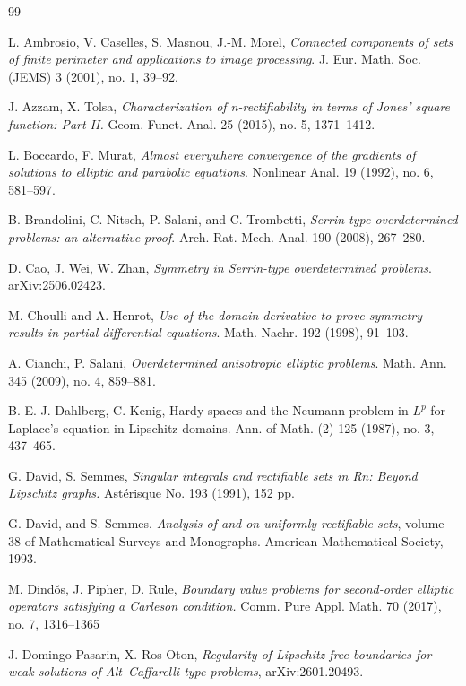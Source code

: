 \documentclass[reqno,11pt]{amsart}
\numberwithin{equation}{section}
\theoremstyle{remark}
\begin{document}
\begin{thebibliography}{99}



 L. Ambrosio, V. Caselles, S. Masnou, J.-M. Morel, \emph{Connected components of sets of finite perimeter and applications to image processing}. J. Eur. Math. Soc. (JEMS) 3 (2001),  no. 1, 39--92.

J. Azzam, X. Tolsa, 
\emph{Characterization of n-rectifiability in terms of Jones' square function: Part II. }
Geom. Funct. Anal. 25 (2015), no. 5, 1371--1412.

L. Boccardo, F. Murat,
{\em Almost everywhere convergence of the gradients of solutions to elliptic and parabolic equations}.
Nonlinear Anal. 19 (1992), no. 6, 581--597.


B. Brandolini, C. Nitsch, P. Salani, and C. Trombetti, \emph{Serrin type overdetermined problems: an alternative proof}. Arch. Rat. Mech. Anal. 190 (2008), 267--280.
 
D. Cao, J. Wei, W. Zhan, \emph{Symmetry in Serrin-type overdetermined problems}.  arXiv:2506.02423.

 M. Choulli and A. Henrot, \emph{Use of the domain derivative to prove symmetry results in partial differential
 equations}. Math. Nachr. 192 (1998), 91--103.
 

 

A. Cianchi, P. Salani, \emph{Overdetermined anisotropic elliptic problems}. Math. Ann. 345 (2009), no. 4, 859--881.

B. E. J. Dahlberg, C.  Kenig,  
Hardy spaces and the Neumann problem in $L^p$ for Laplace's equation in Lipschitz domains.
Ann. of Math. (2) 125 (1987), no. 3, 437--465.

G. David, S. Semmes, 
\emph{Singular integrals and rectifiable sets in Rn: Beyond Lipschitz graphs.}
Ast\'erisque No. 193 (1991), 152 pp.


G. David, and S. Semmes. \emph{Analysis of and on uniformly rectifiable sets}, volume 38 of Mathematical Surveys and Monographs. American Mathematical Society, 1993.


M. Dind\u{o}s, J. Pipher, D. Rule, \emph{Boundary value problems for second-order elliptic operators satisfying a Carleson condition.}
Comm. Pure Appl. Math. 70 (2017), no. 7, 1316--1365

J. Domingo-Pasarin, X. Ros-Oton, \emph{Regularity of Lipschitz free boundaries for weak solutions of Alt--Caffarelli type problems}, 	arXiv:2601.20493.




\end{thebibliography}
\end{document}
